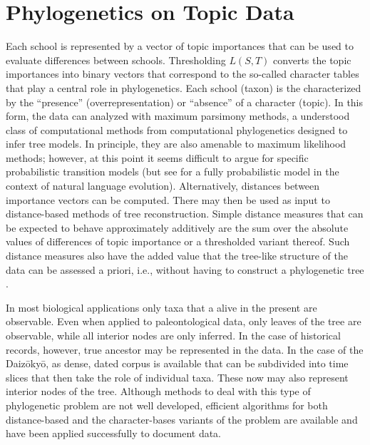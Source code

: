 \documentclass[a4paper,10pt]{article}
\newcommand{\TODO}[1]{\begingroup\color{red}#1\endgroup}
\begin{document}
{\section{Phylogenetics on Topic Data} 

Each \TODO{school} is represented by a vector of topic importances that can
be used to evaluate differences between \TODO{schools}.  Thresholding
$L(S,T)$ converts the topic importances into binary vectors that correspond
to the so-called character tables that play a central role in
phylogenetics. Each \TODO{school} (taxon) is the characterized by the
``presence'' (overrepresentation) or ``absence'' of a character (topic).
In this form, the data can analyzed with maximum parsimony methods, a
understood class of computational methods from computational phylogenetics
designed to infer tree models. In principle, they are also amenable to
maximum likelihood methods; however, at this point it seems difficult to
argue for specific probabilistic transition models (but see
\cite{Hruschka:15} for a fully probabilistic model in the context of
natural language evolution). Alternatively, distances between importance
vectors can be computed. There may then be used as input to distance-based
methods of tree reconstruction. Simple distance measures that can be
expected to behave approximately additively are the sum over the absolute
values of differences of topic importance or a thresholded variant
thereof. Such distance measures also have the added value that the
tree-like structure of the data can be assessed a priori, i.e., without
having to construct a phylogenetic tree \cite{Misof:14}.

In most biological applications only taxa that a alive in the present are
observable. Even when applied to paleontological data, only leaves of the
tree are observable, while all interior nodes are only inferred. In the
case of historical records, however, true ancestor may be represented in
the data. In the case of the Daiz{\=o}ky{\=o}, as dense, dated corpus is
available that can be subdivided into time slices that then take the role
of individual taxa. These now may also represent interior nodes of the
tree. Although methods to deal with this type of phylogenetic problem are
not well developed, efficient algorithms for both distance-based and the
character-bases variants of the problem are available \cite{Telles:13} and
have been applied successfully to document data. 


















}
\end{document}
